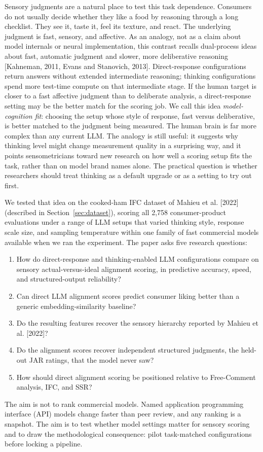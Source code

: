 \documentclass[11pt]{article}
\begin{document}
Sensory judgments are a natural place to test this task dependence. Consumers
do not usually decide whether they like a food by reasoning through a long
checklist. They see it, taste it, feel its texture, and react. The underlying
judgment is fast, sensory, and affective. As an analogy, not as a claim about
model internals or neural implementation, this contrast recalls dual-process
ideas about fast, automatic judgment and slower, more deliberative reasoning
[Kahneman, 2011, Evans and Stanovich, 2013]. Direct-response configurations
return answers without extended intermediate reasoning; thinking configurations
spend more test-time compute on that intermediate stage. If the human target is
closer to a fast affective judgment than to deliberate analysis, a
direct-response setting may be the better match for the scoring job. We call
this idea \emph{model-cognition fit}: choosing the setup whose style of
response, fast versus deliberative, is better matched to the judgment being
measured. The human brain is far more complex than any current LLM. The
analogy is still useful: it suggests why thinking level might change
measurement quality in a surprising way, and it points sensometricians toward
new research on how well a scoring setup fits the task, rather than on model
brand names alone. The practical question is whether researchers should treat
thinking as a default upgrade or as a setting to try out first.

We tested that idea on the cooked-ham IFC dataset of Mahieu et al. [2022]
(described in Section~\ref{sec:dataset}), scoring all 2,758 consumer-product
evaluations under a range of LLM setups that varied thinking style, response
scale size, and sampling temperature within one family of fast commercial
models available when we ran the experiment. The paper asks five research
questions:
\begin{enumerate}
\item How do direct-response and thinking-enabled LLM configurations compare on
sensory actual-versus-ideal alignment scoring, in predictive accuracy, speed,
and structured-output reliability?
\item Can direct LLM alignment scores predict consumer liking better than a
generic embedding-similarity baseline?
\item Do the resulting features recover the sensory hierarchy reported by
Mahieu et al. [2022]?
\item Do the alignment scores recover independent structured judgments, the
held-out JAR ratings, that the model never saw?
\item How should direct alignment scoring be positioned relative to
Free-Comment analysis, IFC, and SSR?
\end{enumerate}
The aim is not to rank commercial models. Named application programming
interface (API) models change faster than peer review, and any ranking is a
snapshot. The aim is to test whether model settings matter for sensory scoring
and to draw the methodological consequence: pilot task-matched configurations
before locking a pipeline.
\end{document}
